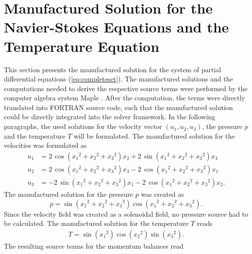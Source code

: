 \section{Manufactured Solution for the Navier-Stokes Equations and the Temperature Equation}
\label{sec:manufacturedsolution}

This section presents the manufactured solution for the system of partial differential equations (\ref{eq:completeset}). The manufactured solutions and the computations needed to derive the respective source terms were performed by the computer algebra system Maple \textregistered \cite{maple}. After the computation, the terms were directly translated into FORTRAN source code, such that the manufactured solution could be directly integrated into the solver framework. In the following paragraphs, the used solutions for the velocity vector \((u_1,u_2,u_3)\), the pressure \(p\) and the temperature \(T\) will be formulated. The manufactured solution for the velocities was formulated as
\begin{align*}
  u_1 &= 2\,\cos \left( {x_1}^{2}+{x_2}^{2}+{x_3}^{2} \right) x_2+2\,\sin \left( {x_1}^{2}+{x_2}^{2}+{x_3}^{2} \right) x_3 \\[0.5em]
  u_2 &= 2\,\cos \left( {x_1}^{2}+{x_2}^{2}+{x_3}^{2} \right) x_3-2\,\cos \left( {x_1}^{2 }+{x_2}^{2}+{x_3}^{2} \right) x_1 \\[0.5em]
  u_3 &= -2\,\sin \left( {x_1}^{2}+{x_2}^{2}+{x_3}^{2} \right) x_1-2\,\cos \left( {x_1}^{ 2}+{x_2}^{2}+{x_3}^{2} \right) x_2.
\end{align*}
The manufactured solution for the pressure \(p\) was created as
\begin{displaymath}
  p = \sin \left( {x_1}^{2}+{x_2}^{2}+{x_3}^{2} \right) \cos \left( {x_1}^{2}+ {x_2}^{2 }+{x_3}^{2} \right).
\end{displaymath}
Since the velocity field was created as a solenoidal field, no pressure source had to be calculated. The manufactured solution for the temperature \(T\) reads
\begin{align*}
  T=\sin \left( {x_1}^{2} \right) \cos \left( {x_2}^{2} \right) \sin \left( {x_3 }^{2} \right).
\end{align*}
The resulting source terms for the momentum balances read
